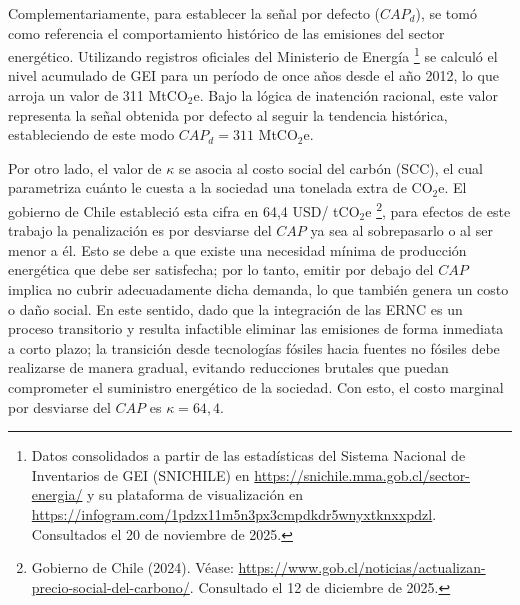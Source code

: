 Complementariamente, para establecer la señal por defecto ($CAP_d$), se tomó como referencia el comportamiento histórico de las emisiones del sector energético. Utilizando registros oficiales del Ministerio de Energía \footnote{Datos consolidados a partir de las estadísticas del Sistema Nacional de Inventarios de GEI (SNICHILE) en \url{https://snichile.mma.gob.cl/sector-energia/} y su plataforma de visualización en \url{https://infogram.com/1pdzx11m5n3px3cmpdkdr5wnyxtknxxpdzl}. Consultados el 20 de noviembre de 2025.} se calculó el nivel acumulado de GEI para un período de once años desde el año 2012, lo que arroja un valor de 311 MtCO$_2$e. Bajo la lógica de inatención racional, este valor representa la señal obtenida por defecto al seguir la tendencia histórica, estableciendo de este modo $CAP_d=311$ MtCO$_2$e.

Por otro lado, el valor de $\kappa$ se asocia al costo social del carbón (SCC), el cual parametriza cuánto le cuesta a la sociedad una tonelada extra de CO$_2$e. El gobierno de Chile estableció esta cifra en 64,4 USD/ tCO$_2$e \footnote{Gobierno de Chile (2024). Véase: \url{https://www.gob.cl/noticias/actualizan-precio-social-del-carbono/}. Consultado el 12 de diciembre de 2025.}, para efectos de este trabajo la penalización es por desviarse del $CAP$ ya sea al sobrepasarlo o al ser menor a él. Esto se debe a que existe una necesidad mínima de producción energética que debe ser satisfecha; por lo tanto, emitir por debajo del $CAP$ implica no cubrir adecuadamente dicha demanda, lo que también genera un costo o daño social. En este sentido, dado que la integración de las ERNC es un proceso transitorio y resulta infactible eliminar las emisiones de forma inmediata a corto plazo; la transición desde tecnologías fósiles hacia fuentes no fósiles debe realizarse de manera gradual, evitando reducciones brutales que puedan comprometer el suministro energético de la sociedad. Con esto, el costo marginal por desviarse del $CAP$ es $\kappa=64,4$.

